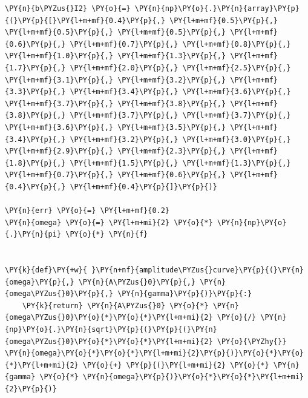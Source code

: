 \begin{tcolorbox}[breakable, size=fbox, boxrule=1pt, pad at break*=1mm,colback=cellbackground, colframe=cellborder]
\begin{Verbatim}[commandchars=\\\{\}]
\PY{n}{b\PYZus{}I2} \PY{o}{=} \PY{n}{np}\PY{o}{.}\PY{n}{array}\PY{p}{(}\PY{p}{[}\PY{l+m+mf}{0.4}\PY{p}{,} \PY{l+m+mf}{0.5}\PY{p}{,} \PY{l+m+mf}{0.5}\PY{p}{,} \PY{l+m+mf}{0.5}\PY{p}{,} \PY{l+m+mf}{0.6}\PY{p}{,} \PY{l+m+mf}{0.7}\PY{p}{,} \PY{l+m+mf}{0.8}\PY{p}{,} \PY{l+m+mf}{1.0}\PY{p}{,} \PY{l+m+mf}{1.3}\PY{p}{,} \PY{l+m+mf}{1.7}\PY{p}{,} \PY{l+m+mf}{2.0}\PY{p}{,} \PY{l+m+mf}{2.5}\PY{p}{,} \PY{l+m+mf}{3.1}\PY{p}{,} \PY{l+m+mf}{3.2}\PY{p}{,} \PY{l+m+mf}{3.3}\PY{p}{,} \PY{l+m+mf}{3.4}\PY{p}{,} \PY{l+m+mf}{3.6}\PY{p}{,} \PY{l+m+mf}{3.7}\PY{p}{,} \PY{l+m+mf}{3.8}\PY{p}{,} \PY{l+m+mf}{3.8}\PY{p}{,} \PY{l+m+mf}{3.7}\PY{p}{,} \PY{l+m+mf}{3.7}\PY{p}{,} \PY{l+m+mf}{3.6}\PY{p}{,} \PY{l+m+mf}{3.5}\PY{p}{,} \PY{l+m+mf}{3.4}\PY{p}{,} \PY{l+m+mf}{3.2}\PY{p}{,} \PY{l+m+mf}{3.0}\PY{p}{,} \PY{l+m+mf}{2.9}\PY{p}{,} \PY{l+m+mf}{2.3}\PY{p}{,} \PY{l+m+mf}{1.8}\PY{p}{,} \PY{l+m+mf}{1.5}\PY{p}{,} \PY{l+m+mf}{1.3}\PY{p}{,} \PY{l+m+mf}{0.7}\PY{p}{,} \PY{l+m+mf}{0.6}\PY{p}{,} \PY{l+m+mf}{0.4}\PY{p}{,} \PY{l+m+mf}{0.4}\PY{p}{]}\PY{p}{)}

\PY{n}{err} \PY{o}{=} \PY{l+m+mf}{0.2}
\PY{n}{omega} \PY{o}{=} \PY{l+m+mi}{2} \PY{o}{*} \PY{n}{np}\PY{o}{.}\PY{n}{pi} \PY{o}{*} \PY{n}{f}


\PY{k}{def}\PY{+w}{ }\PY{n+nf}{amplitude\PYZus{}curve}\PY{p}{(}\PY{n}{omega}\PY{p}{,} \PY{n}{A\PYZus{}0}\PY{p}{,} \PY{n}{omega\PYZus{}0}\PY{p}{,} \PY{n}{gamma}\PY{p}{)}\PY{p}{:}
    \PY{k}{return} \PY{n}{A\PYZus{}0} \PY{o}{*} \PY{n}{omega\PYZus{}0}\PY{o}{*}\PY{o}{*}\PY{l+m+mi}{2} \PY{o}{/} \PY{n}{np}\PY{o}{.}\PY{n}{sqrt}\PY{p}{(}\PY{p}{(}\PY{n}{omega\PYZus{}0}\PY{o}{*}\PY{o}{*}\PY{l+m+mi}{2} \PY{o}{\PYZhy{}} \PY{n}{omega}\PY{o}{*}\PY{o}{*}\PY{l+m+mi}{2}\PY{p}{)}\PY{o}{*}\PY{o}{*}\PY{l+m+mi}{2} \PY{o}{+} \PY{p}{(}\PY{l+m+mi}{2} \PY{o}{*} \PY{n}{gamma} \PY{o}{*} \PY{n}{omega}\PY{p}{)}\PY{o}{*}\PY{o}{*}\PY{l+m+mi}{2}\PY{p}{)}



\end{Verbatim}
\end{tcolorbox}

